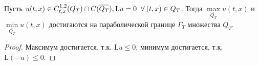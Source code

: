 \begin{conseq}
Пусть $u(t,x) \in C^{1,2}_{t,x}(Q_T) \cap C(\overline{Q_T}), \mathrm{L}u = 0 \;\;\forall\:(t,x) \in Q_T$.
 Тогда $\max\limits_{\overline{Q_T}}u(t,x)$ и $\min\limits_{\overline{Q_T}}u(t,x)$ достигаются на параболической границе $\Gamma_T$ множества $Q_T$.
 \begin{proof}
 Максимум достигается, т.к. $\mathrm{L}u \leq 0$, минимум достигается, т.к. $\mathrm{L}(-u) \leq 0$.
 \end{proof}
\end{conseq}
